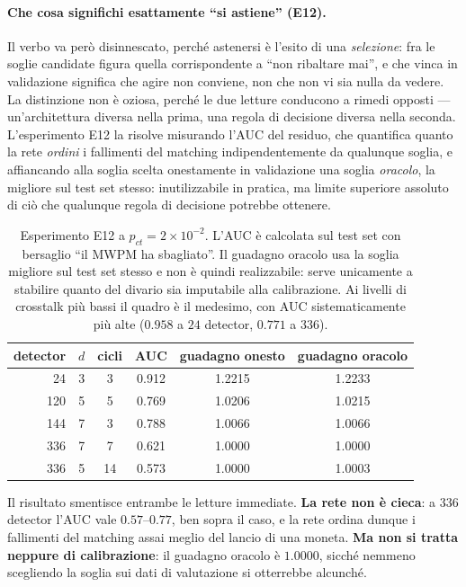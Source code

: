 \paragraph{Che cosa significhi esattamente ``si astiene'' (E12).}
Il verbo va però disinnescato, perché astenersi è l'esito di una \emph{selezione}: fra le soglie candidate figura quella corrispondente a ``non ribaltare mai'', e che vinca in validazione significa che agire non conviene, non che non vi sia nulla da vedere. La distinzione non è oziosa, perché le due letture conducono a rimedi opposti --- un'architettura diversa nella prima, una regola di decisione diversa nella seconda. L'esperimento E12 la risolve misurando l'\ac{AUC} del residuo, che quantifica quanto la rete \emph{ordini} i fallimenti del matching indipendentemente da qualunque soglia, e affiancando alla soglia scelta onestamente in validazione una soglia \emph{oracolo}, la migliore sul test set stesso: inutilizzabile in pratica, ma limite superiore assoluto di ciò che qualunque regola di decisione potrebbe ottenere.

\begin{table}[H]
\centering
\small
\begin{tabular}{rcc cc c}
\toprule
\textbf{detector} & $d$ & \textbf{cicli} & \textbf{AUC} & \textbf{guadagno onesto} & \textbf{guadagno oracolo} \\
\midrule
\phantom{0}24 & 3 & \phantom{0}3 & 0.912 & 1.2215 & 1.2233 \\
120 & 5 & \phantom{0}5 & 0.769 & 1.0206 & 1.0215 \\
144 & 7 & \phantom{0}3 & 0.788 & 1.0066 & 1.0066 \\
336 & 7 & \phantom{0}7 & 0.621 & 1.0000 & 1.0000 \\
336 & 5 & 14 & 0.573 & 1.0000 & 1.0003 \\
\bottomrule
\end{tabular}
\caption[Discriminazione e guadagno al crescere della larghezza dell'ingresso]{Esperimento E12 a $p_{ct} = 2\times10^{-2}$. L'\ac{AUC} è calcolata sul test set con bersaglio ``il \ac{MWPM} ha sbagliato''. Il guadagno oracolo usa la soglia migliore sul test set stesso e non è quindi realizzabile: serve unicamente a stabilire quanto del divario sia imputabile alla calibrazione. Ai livelli di crosstalk più bassi il quadro è il medesimo, con \ac{AUC} sistematicamente più alte ($0.958$ a $24$ detector, $0.771$ a $336$).}
\label{tab:neural_auc}
\end{table}

Il risultato smentisce entrambe le letture immediate. \textbf{La rete non è cieca}: a $336$ detector l'\ac{AUC} vale $0.57$--$0.77$, ben sopra il caso, e la rete ordina dunque i fallimenti del matching assai meglio del lancio di una moneta. \textbf{Ma non si tratta neppure di calibrazione}: il guadagno oracolo è $1.0000$, sicché nemmeno scegliendo la soglia sui dati di valutazione si otterrebbe alcunché.


